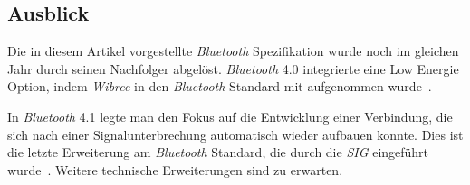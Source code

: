 \begin{multicols}{3}
\subsection*{Ausblick}
Die in diesem Artikel vorgestellte \textit{Bluetooth} Spezifikation wurde noch im gleichen Jahr durch seinen Nachfolger abgelöst. \textit{Bluetooth} 4.0 integrierte eine Low Energie Option, indem \textit{Wibree} in den \textit{Bluetooth} Standard mit aufgenommen wurde~\cite{bluetooth3.0.1}. 

In \textit{Bluetooth} 4.1 legte man den Fokus auf die Entwicklung einer Verbindung, die sich nach einer Signalunterbrechung automatisch wieder aufbauen konnte. Dies ist die letzte Erweiterung am \textit{Bluetooth} Standard, die durch die \textit{SIG} eingeführt wurde~\cite{bluetooth3.0.1}. Weitere technische Erweiterungen sind zu erwarten. 

\printbibliography[segment=1,heading=subbibliography]
\end{multicols}

\newpage
